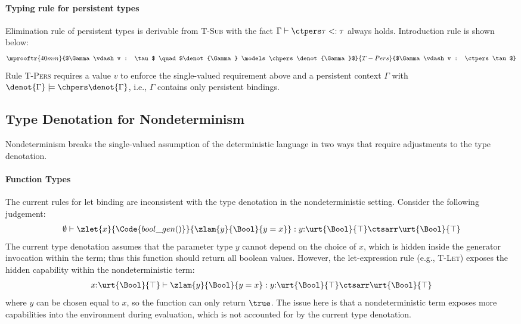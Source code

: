 \paragraph{Typing rule for persistent types}
Elimination rule of persistent types is derivable from \textsc{T-Sub} with the fact $\Gamma \vdash \ctpers \tau <: \tau$ always holds.
Introduction rule is shown below:
\begin{align*}
\mprooftr{40mm}
      {$\Gamma \vdash v : \tau$ \quad $\denot{\Gamma} \models \chpers \denot{\Gamma}$}
      {T-Pers}
      {$\Gamma \vdash v : \ctpers \tau$}
\end{align*}\noindent
Rule \textsc{T-Pers} requires a value $v$ to enforce the single-valued
requirement above and a persistent context $\Gamma$ with
$\denot{\Gamma} \models \chpers \denot{\Gamma}$, i.e., $\Gamma$ contains only persistent bindings.

\subsection{Type Denotation for Nondeterminism}\label{subsec:nondet-denotation}

Nondeterminism breaks the single-valued assumption of the deterministic
language in two ways that require adjustments to the type denotation.

\paragraph{Function Types} The current rules for let binding are inconsistent with the type denotation in the nondeterministic setting. Consider the following judgement:
\begin{align*}
  \emptyset \vdash \zlet{x}{\Code{bool\_gen()}}{\zlam{y}{\Bool}{y = x}} : y{:}\urt{\Bool}{\top} \ctsarr \urt{\Bool}{\top}
\end{align*}\noindent
The current type denotation assumes that the parameter type $y$ cannot depend on the choice of $x$, which is hidden inside the generator invocation within the term; thus this function should return all boolean values. However, the let-expression rule (e.g., \textsc{T-Let}) exposes the hidden capability within the nondeterministic term:
\begin{align*}
  x{:}\urt{\Bool}{\top} \vdash \zlam{y}{\Bool}{y = x} : y{:}\urt{\Bool}{\top} \ctsarr \urt{\Bool}{\top}
\end{align*}\noindent
where $y$ can be chosen equal to $x$, so the function can only return $\true$.
The issue here is that a nondeterministic term exposes more capabilities into the environment during evaluation, which is not accounted for by the current type denotation.

